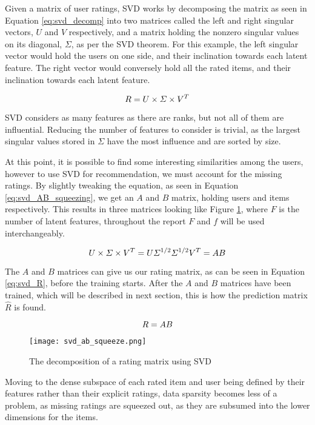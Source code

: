 Given a matrix of user ratings, SVD works by decomposing the matrix as seen in Equation \ref{eq:svd_decomp} into two matrices called the left and right singular vectors, $U$ and $V$ respectively, and a matrix holding the nonzero singular values on its diagonal, $\Sigma$, as per the SVD theorem\cite{svdtheorem}. For this example, the left singular vector would hold the users on one side, and their inclination towards each latent feature. The right vector would conversely hold all the rated items, and their inclination towards each latent feature\cite{linearalgebra_svd}\cite{preprocessing}. 

\begin{equation} \label{eq:svd_decomp}
\centering
R = U\times \Sigma \times V^T
\end{equation}

SVD considers as many features as there are ranks, but not all of them are influential. Reducing the number of features to consider is trivial, as the largest singular values stored in $\Sigma$ have the most influence and are sorted by size.

At this point, it is possible to find some interesting similarities among the users, however to use SVD for recommendation, we must account for the missing ratings. By slightly tweaking the equation, as seen in Equation \ref{eq:svd_AB_squeezing}, we get an $A$ and $B$ matrix, holding users and items respectively. This results in three matrices looking like Figure \ref{fig:svdSqueeze}, where $F$ is the number of latent features, throughout the report $F$ and $f$ will be used interchangeably. 

\begin{equation}\label{eq:svd_AB_squeezing}
\centering
U\times \Sigma \times V^T = U\Sigma^{1/2} \Sigma^{1/2}V^T = AB
\end{equation}

The $A$ and $B$ matrices can give us our rating matrix, as can be seen in Equation \ref{eq:svd_R}, before the training starts. After the $A$ and $B$ matrices have been trained, which will be described in next section, this is how the prediction matrix $\hat{R}$ is found.

\begin{equation}\label{eq:svd_R}
\centering
R = AB
\end{equation}

\begin{figure}[H]
	\centering
	\texttt{[image: svd\_ab\_squeeze.png]}
	\caption{The decomposition of a rating matrix using SVD\cite{preprocessing}}
	\label{fig:svdSqueeze}
\end{figure}
Moving to the dense subspace of each rated item and user being defined by their features rather than their explicit ratings, data sparsity becomes less of a problem, as missing ratings are squeezed out, as they are subsumed into the lower dimensions for the items.

